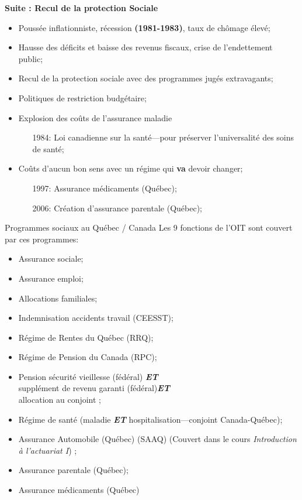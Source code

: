 \documentclass[10pt, french]{article}
\begin{document}
\begin{multicols*}{3}
\textbf{Suite : Recul de la protection Sociale}
\begin{itemize}
	\item	Poussée inflationniste, récession \textbf{(1981-1983)}, taux de chômage élevé;
	\item	Hausse des déficits et baisse des revenus fiscaux, crise de l'endettement public;
	\item	Recul de la protection sociale avec des programmes jugés extravagants;
	\item	Politiques de restriction budgétaire;
	\item	Explosion des coûts de l'assurance maladie
		\begin{itemize}
		\item[1984: ]	Loi canadienne sur la santé---pour préserver l'universalité des soins de santé;
		\end{itemize}
	\item	Coûts d'aucun \og bon sens \fg{} avec un régime qui \textbf{va} devoir changer;
		\begin{itemize}
		\item[1997:]	Assurance médicaments (Québec);
		\item[2006:]	Création d'assurance parentale (Québec);
		\end{itemize}
\end{itemize}


\begin{conceptgen}{Programmes sociaux au Québec / Canada}
Les 9 fonctions de l'OIT sont couvert par ces programmes:
\begin{itemize}
	\item	Assurance sociale;
	\item	Assurance emploi;
	\item	Allocations familiales;
	\item	Indemnisation accidents travail (CEESST);
	\item	Régime de Rentes du Québec (RRQ);
	\item	Régime de Pension du Canada (RPC);
	\item	Pension sécurité vieillesse (fédéral) \textbf{\textit{ET}}\\ supplément de revenu garanti (fédéral)\textbf{\textit{ET}}\\ allocation au conjoint ;
	\item	Régime de santé (maladie \textbf{\textit{ET}} hospitalisation---conjoint Canada-Québec);
	\item	\textcolor{amaranth}{Assurance Automobile (Québec) (SAAQ) (Couvert dans le cours \textit{Introduction à l'actuariat I})} ;
	\item	Assurance parentale (Québec);
	\item	Assurance médicaments (Québec)
\end{itemize}
\end{conceptgen}


\end{multicols*}
\end{document}
